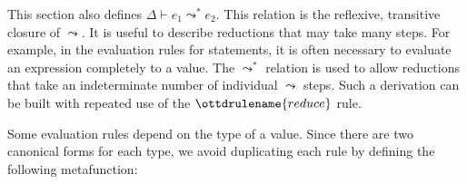 \documentclass[11pt]{article}
\begin{document}
This section also defines $\Delta \vdash e_1 \leadsto^{*} e_2$.  This relation
is the reflexive, transitive closure of $\leadsto$.  It is useful to describe
reductions that may take many steps.  For example, in the evaluation rules for
statements, it is often necessary to evaluate an expression completely to a
value.  The $\leadsto^{*}$ relation is used to allow reductions that take an
indeterminate number of individual $\leadsto$ steps.  Such a derivation can be
built with repeated use of the $\ottdrulename{reduce}$ rule.

Some evaluation rules depend on the type of a value. Since there are two canonical
forms for each type, we avoid duplicating each rule by defining the following metafunction:

\medskip

\ottfundefncomputeXXtype

\ottdefnsreduceXXexp

\ottdefnshelpers

\ottdefnsmultistepXXexp
\end{document}
